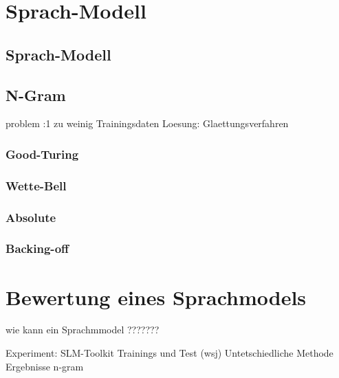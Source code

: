 \chapter{Sprach-Modell}
\label{chapter:Sprach-Modell}

\section{Sprach-Modell}
	

\section{N-Gram}
 problem :1 zu weinig Trainingsdaten
 Loesung: Glaettungsverfahren
		
		\subsection{Good-Turing}
		\subsection{Wette-Bell}
		\subsection{Absolute}
		\subsection{Backing-off}
\chapter{Bewertung eines Sprachmodels}
\label{chapter:bewertung_sprachmodel}
wie kann ein Sprachmmodel ???????

	Experiment:
		SLM-Toolkit
		Trainings und Test (wsj)
		Untetschiedliche Methode
		Ergebnisse
		   n-gram 